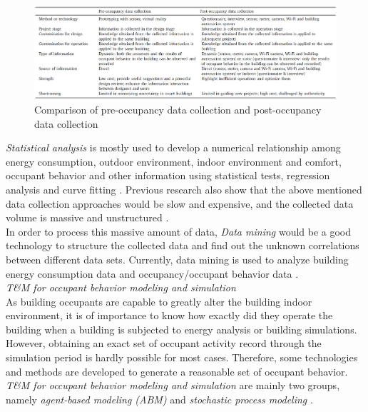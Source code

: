 \documentclass[11pt, a4paper]{article}
\theoremstyle{definition}
\begin{document}
			\begin{figure}[h!]
			\centering
			\includegraphics[scale=0.4]{Table1.jpg}
			\caption{Comparison of pre-occupancy data collection and post-occupancy data collection \cite{ZOU2018165}}
			\label{fig:technology1}
			\end{figure}

			\textit{Statistical analysis} is mostly used to develop a numerical relationship among energy consumption, outdoor environment, indoor environment and comfort, occupant behavior and other information using statistical tests, regression analysis and curve fitting \cite{ZOU2018165}. Previous research also show that the above mentioned data collection approaches would be slow and expensive, and the collected data volume is massive and unstructured \cite{liang2016occupancy}.\\

			In order to process this massive amount of data, \textit{Data mining} would be a good technology to structure the collected data and find out the unknown correlations between different data sets. Currently, data mining is used to analyze building energy consumption data and occupancy/occupant behavior data \cite{xiao2014data}.\\

			\textit{T\&M for occupant behavior modeling and simulation}\\

				As building occupants are capable to greatly alter the building indoor environment, it is of importance to know how exactly did they operate the building when a building is subjected to energy analysis or building simulations. However, obtaining an exact set of occupant activity record through the simulation period is hardly possible for most cases. Therefore, some technologies and methods are developed to generate a reasonable set of occupant behavior. \textit{T\&M for occupant behavior modeling and simulation} are mainly two groups, namely \textit{agent-based modeling (ABM)} and \textit{stochastic process modeling} \cite{ZOU2018165}.\\
\end{document}

